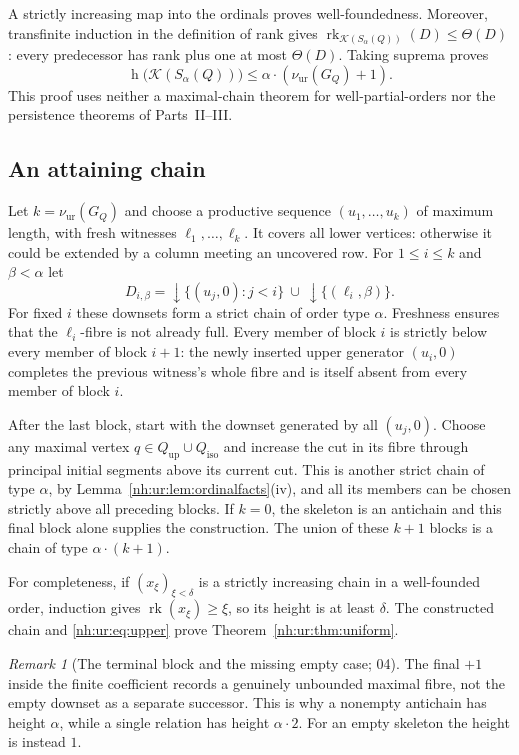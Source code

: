 \documentclass[11pt,a4paper]{article}
\theoremstyle{definition}
\theoremstyle{remark}
\newtheorem{remark}[theorem]{Remark}
\newcommand{\K}{\mathcal K}
\newcommand{\hgt}{\operatorname{h}}
\newcommand{\rk}{\operatorname{rk}}
\newcommand{\Qup}{Q_{\mathrm{up}}}
\newcommand{\Qiso}{Q_{\mathrm{iso}}}
\newcommand{\nuur}{\nu_{\mathrm{ur}}}
\begin{document}
A strictly increasing map into the ordinals proves well-foundedness.
Moreover, transfinite induction in the definition of rank gives
$\rk_{\K(S_\alpha(Q))}(D)\le\Theta(D)$: every predecessor has rank plus one at
most $\Theta(D)$. Taking suprema proves
\begin{equation}\label{nh:ur:eq:upper}
 \hgt\bigl(\K(S_\alpha(Q))\bigr)\le\alpha\cdot(\nuur(G_Q)+1).
\end{equation}
This proof uses neither a maximal-chain theorem for well-partial-orders nor
the persistence theorems of Parts~II--III.

\subsection{An attaining chain}
Let $k=\nuur(G_Q)$ and choose a productive sequence $(u_1,\ldots,u_k)$ of
maximum length, with fresh witnesses $\ell_1,\ldots,\ell_k$. It covers all
lower vertices: otherwise it could be extended by a column meeting an
uncovered row. For $1\le i\le k$ and $\beta<\alpha$ let
\[
 D_{i,\beta}={\downarrow}\{(u_j,0):j<i\}
              \ \cup\ {\downarrow}\{(\ell_i,\beta)\}.
\]
For fixed $i$ these downsets form a strict chain of order type $\alpha$.
Freshness ensures that the $\ell_i$-fibre is not already full. Every member
of block $i$ is strictly below every member of block $i+1$: the newly
inserted upper generator $(u_i,0)$ completes the previous witness's whole
fibre and is itself absent from every member of block $i$.

After the last block, start with the downset generated by all $(u_j,0)$.
Choose any maximal vertex $q\in\Qup\cup\Qiso$ and increase the cut in its
fibre through principal initial segments above its current cut. This is
another strict chain of type $\alpha$, by
Lemma~\ref{nh:ur:lem:ordinalfacts}(iv), and all its members can be chosen
strictly above all preceding blocks. If $k=0$, the skeleton is an antichain
and this final block alone supplies the construction. The union of these
$k+1$ blocks is a chain of type $\alpha\cdot(k+1)$.

For completeness, if $(x_\xi)_{\xi<\delta}$ is a strictly increasing chain in
a well-founded order, induction gives $\rk(x_\xi)\ge\xi$, so its height is at
least $\delta$. The constructed chain and \eqref{nh:ur:eq:upper} prove
Theorem~\ref{nh:ur:thm:uniform}.

\begin{remark}[The terminal block and the missing empty case; 04]
\label{nh:ur:rem:terminal}
The final $+1$ inside the finite coefficient records a genuinely unbounded
maximal fibre, not the empty downset as a separate successor. This is why a
nonempty antichain has height $\alpha$, while a single relation has height
$\alpha\cdot2$. For an empty skeleton the height is instead $1$.
\end{remark}
\end{document}
